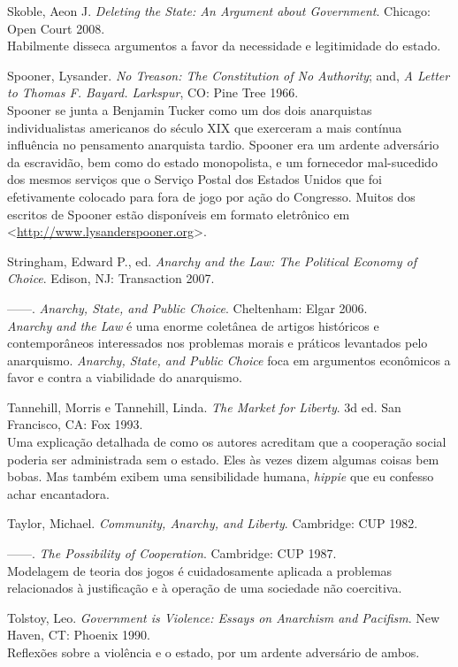 \begin{hangparas}{0.25in}{1}
Skoble, Aeon J. \emph{Deleting the State: An Argument about Government}. Chicago: Open Court 2008.\smallskip\\
Habilmente disseca argumentos a favor da necessidade e legitimidade do estado.

Spooner, Lysander. \emph{No Treason: The Constitution of No Authority}; and, \emph{A Letter to Thomas F. Bayard. Larkspur}, CO: Pine Tree 1966.\smallskip\\
Spooner se junta a Benjamin Tucker como um dos dois anarquistas individualistas americanos do século XIX que exerceram a mais contínua influência no pensamento anarquista tardio. Spooner era um ardente adversário da escravidão, bem como do estado monopolista, e um fornecedor mal-sucedido dos mesmos serviços que o Serviço Postal dos Estados Unidos que foi efetivamente colocado para fora de jogo por ação do Congresso. Muitos dos escritos de Spooner estão disponíveis em formato eletrônico em <\url{http://www.lysanderspooner.org}>.

Stringham, Edward P., ed. \emph{Anarchy and the Law: The Political Economy of Choice}. Edison, NJ: Transaction 2007.

------. \emph{Anarchy, State, and Public Choice}. Cheltenham: Elgar 2006.\smallskip\\
\emph{Anarchy and the Law} é uma enorme coletânea de artigos históricos e contemporâneos interessados nos problemas morais e práticos levantados pelo anarquismo. \emph{Anarchy, State, and Public Choice} foca em argumentos econômicos a favor e contra a viabilidade do anarquismo.

Tannehill, Morris e Tannehill, Linda. \emph{The Market for Liberty}. 3d ed. San Francisco, CA: Fox 1993.\smallskip\\
Uma explicação detalhada de como os autores acreditam que a cooperação social poderia ser administrada sem o estado. Eles às vezes dizem algumas coisas bem bobas. Mas também exibem uma sensibilidade humana, \emph{hippie} que eu confesso achar encantadora.

Taylor, Michael. \emph{Community, Anarchy, and Liberty}. Cambridge: CUP 1982.

------. \emph{The Possibility of Cooperation}. Cambridge: CUP 1987.\smallskip\\
Modelagem de teoria dos jogos é cuidadosamente aplicada a problemas relacionados à justificação e à operação de uma sociedade não coercitiva.

Tolstoy, Leo. \emph{Government is Violence: Essays on Anarchism and Pacifism}. New Haven, CT: Phoenix 1990.\smallskip\\
Reflexões sobre a violência e o estado, por um ardente adversário de ambos.


\end{hangparas}
